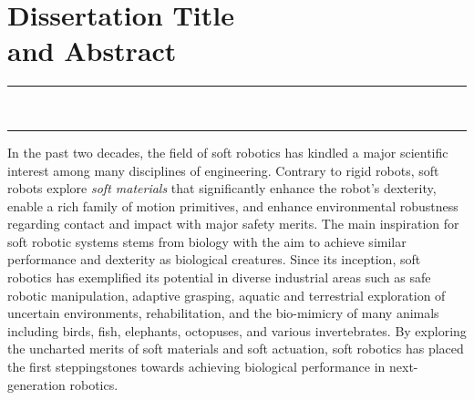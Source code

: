 \chapter*{Dissertation Title \\ and Abstract} %
\vspace{-12mm}
\begin{center}
\rule{\textwidth}{.75pt}\vspace*{1mm}
\textbf{{\Large \maintitle} \\[1.0em]}
\rule{\textwidth}{.75pt}
\end{center}
\vspace*{2ex}

In the past two decades, the field of soft robotics has kindled a major  scientific interest among many disciplines of engineering. Contrary to rigid robots, soft robots explore \emph{soft materials} that significantly enhance the robot’s dexterity, enable a rich family of motion primitives, and enhance environmental robustness regarding contact and impact with major safety merits. The main inspiration for soft robotic systems stems from biology with the aim to achieve similar performance and dexterity as biological creatures. Since its inception, soft robotics has exemplified its potential in diverse industrial areas such as safe robotic manipulation, adaptive grasping, aquatic and terrestrial exploration of uncertain environments, rehabilitation, and the bio-mimicry of many animals including birds, fish, elephants, octopuses, and various invertebrates. By exploring the uncharted merits of soft materials and soft actuation, soft robotics has placed the first steppingstones towards achieving biological performance in next-generation robotics.

